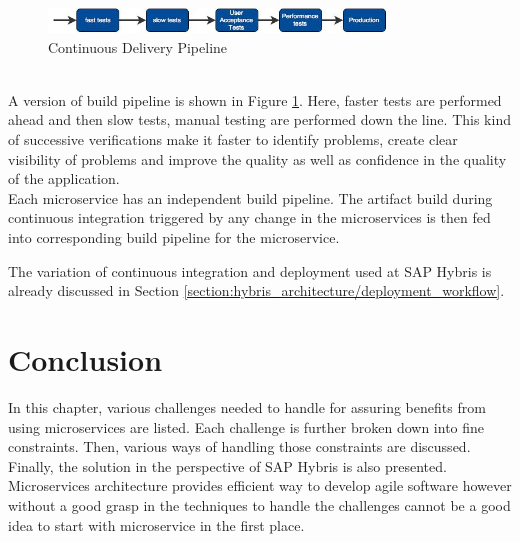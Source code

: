 \begin{enumerate}
\\
\begin{figure}[H]
\begin{center}
\includegraphics[width=0.8\textwidth]{figures/challenges_six_continuous_delivery}
\caption{Continuous Delivery Pipeline \cite{Newman:2015aa}}
\label{fig:challanges_of_microservices_architecture/deployment/continuous_delivery}
\end{center}
\end{figure}
\\
A version of build pipeline is shown in Figure \ref{fig:challanges_of_microservices_architecture/deployment/continuous_delivery}. Here, faster tests are performed ahead and then slow tests, manual testing are performed down the line. This kind of successive verifications make it faster to identify problems, create clear visibility of problems and improve the quality as well as confidence in the quality of the application.\\
Each microservice has an independent build pipeline. The artifact build during continuous integration triggered by any change in the microservices is then fed into corresponding build pipeline for the microservice. \cite{Newman:2015aa} \cite{Fowler:2013aa}
\end{enumerate}

\begin{shaded}
The variation of continuous integration and deployment used at SAP Hybris is already discussed in Section \ref{section:hybris_architecture/deployment_workflow}.
\end{shaded}

\section{Conclusion}\label{section:challanges_of_microservices_architecture/conclusion}
In this chapter, various challenges needed to handle for assuring benefits from using microservices are listed. Each challenge is further broken down into fine constraints. Then, various ways of handling those constraints are discussed. Finally, the solution in the perspective of SAP Hybris is also presented. Microservices architecture provides efficient way to develop agile software however without a good grasp in the techniques to handle the challenges cannot be a good idea to start with microservice in the first place.













